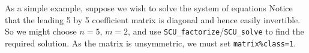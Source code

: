 \documentclass{galahad}
\newcommand{\packagename}{SCU}
\begin{document}
\galexample
As a simple example, suppose we wish to solve the system of
equations
Notice that the leading 5 by 5 coefficient matrix is diagonal and
hence easily invertible. So we might choose $n = 5$, $m = 2$,
and use {\tt \packagename\_factorize}/{\tt \packagename\_solve} to find the required
solution. As the matrix is unsymmetric, we must set {\tt matrix\%class=1}.
\end{document}
